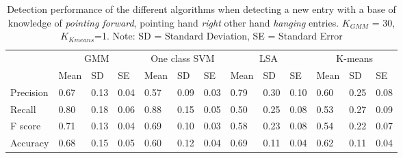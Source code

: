 \begin{table}[!ht]
	\footnotesize
	\renewcommand{\arraystretch}{2}
	\begin{tabular}{p{1.2cm}p{0.7cm}p{0.6cm}p{0.7cm}p{0.7cm}p{0.6cm}p{0.7cm}p{0.7cm}p{0.6cm}p{0.7cm}p{0.7cm}p{0.6cm}p{0.7cm}}
	\hline 
	 & \multicolumn{3}{c}{GMM}& \multicolumn{3}{c}{One class SVM}& \multicolumn{3}{c}{LSA}& \multicolumn{3}{c}{K-means} \\
	 & Mean    & SD & SE& Mean    & SD & SE& Mean    & SD & SE& Mean    & SD & SE \\
	\hline
	Precision  & 0.67 & 0.13 & 0.04 & 0.57 & 0.09 & 0.03 & 0.79 & 0.30 & 0.10 & 0.60 & 0.25 & 0.08       \\
	Recall  & 0.80 & 0.18 & 0.06 & 0.88 & 0.15 & 0.05 & 0.50 & 0.25 & 0.08 & 0.53 & 0.27 & 0.09    \\
	F score  & 0.71 & 0.13 & 0.04 & 0.69 & 0.10 & 0.03 & 0.58 & 0.23 & 0.08 & 0.54 & 0.22 & 0.07    \\
	Accuracy   & 0.68 & 0.15 & 0.05 & 0.60 & 0.12 & 0.04 & 0.69 & 0.11 & 0.04 & 0.62 & 0.11 & 0.04   \\
	\hline
	\end{tabular}
	\centering
	\caption[Novelty Detection perfomance for emph{pointing forward}, pointing hand \emph{right} other hand \emph{hanging} entries]{Detection performance of the different algorithms when detecting a new entry with a base of knowledge of \emph{pointing forward}, pointing hand \emph{right} other hand \emph{hanging} entries. $ K_{GMM} $ = 30, $ K_{Kmeans} $=1. Note: SD = Standard Deviation, SE = Standard Error}
\end{table}

\begin{flushright}

\end{flushright}